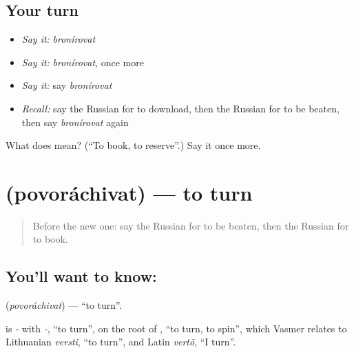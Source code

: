 \subsection*{Your turn}
\begin{itemize}
\raggedright
  \item \emph{Say it:} \emph{bronírovat}
  \item \emph{Say it:} \emph{bronírovat}, once more
  \item \emph{Say it:} say \emph{bronírovat}
  \item \emph{Recall:} say the Russian for to download, then the Russian for to be beaten, then say \emph{bronírovat} again
\end{itemize}

\begin{tcolorbox}[breakable,colback=teal!4,colframe=teal!35!black,title={Before you move on}]
What does  mean? (\textquotedblleft{}To book, to reserve\textquotedblright{}.) Say it once more.
\end{tcolorbox}
\section[\texorpdfstring{\ru{поворачивать} (povoráchivat)}{поворачивать (povoráchivat)}]{ (povoráchivat) — to turn}

\label{lesson:RU-C146-povorachivat}



\begin{quote}
Before the new one: say the Russian for to be beaten, then the Russian for to book.
\end{quote}

\subsection*{You'll want to know: }
\textbf{} (\emph{povoráchivat}) — \textquotedblleft{}to turn\textquotedblright{}.

\begin{cousinweb}
\textbf{} is \emph{-} with \emph{-}, \textquotedblleft{}to turn\textquotedblright{}, on the root of \emph{}, \textquotedblleft{}to turn, to spin\textquotedblright{}, which Vasmer relates to Lithuanian \emph{versti}, \textquotedblleft{}to turn\textquotedblright{}, and Latin \emph{vertō}, \textquotedblleft{}I turn\textquotedblright{}.
\end{cousinweb}

